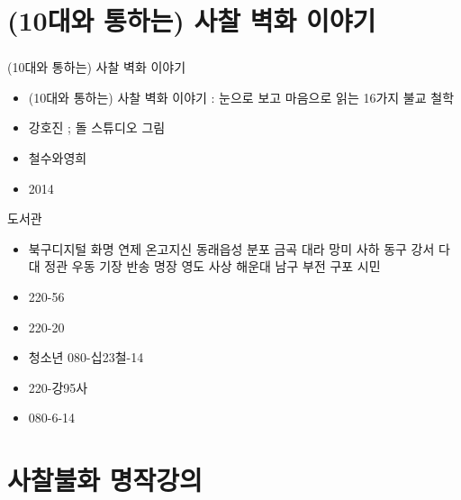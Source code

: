 \documentclass[aspectratio=1610,17pt,xcolor=pdftex,dvipsnames,table,handout]{beamer}
\begin{document}
		\section{ (10대와 통하는) 사찰 벽화 이야기 }
		\begin{frame} [t,plain]
		\frametitle{}

			\begin{block} { (10대와 통하는) 사찰 벽화 이야기 }
			\setlength{\leftmargini}{4em}			
			\begin{itemize}
				\item [제목]  	(10대와 통하는) 사찰 벽화 이야기 : 눈으로 보고 마음으로 읽는 16가지 불교 철학
				\item [지은이]	강호진 ; 돌 스튜디오 그림
				\item [출판사]	철수와영희
				\item [출판일]	2014
			\end{itemize}
			\end{block}						
								
			\begin{block} {도서관}
			\setlength{\leftmargini}{4em}			
			\begin{itemize}
				\item [도서관]		북구디지털 화명 연제 온고지신 동래읍성 분포 금곡 대라 망미 사하 동구 강서 다대 정관 우동 기장 반송 명장 영도 사상 해운대 남구 부전 구포 시민 
				\item [중앙]		220-56
				\item [수정]		220-20
				\item [남구] 	청소년 080-십23철-14
				\item [금정] 	220-강95사
				\item [읍성] 	080-6-14
			\end{itemize}
			\end{block}						

		\end{frame}						



		\section{ 사찰불화 명작강의 }
\end{document}
